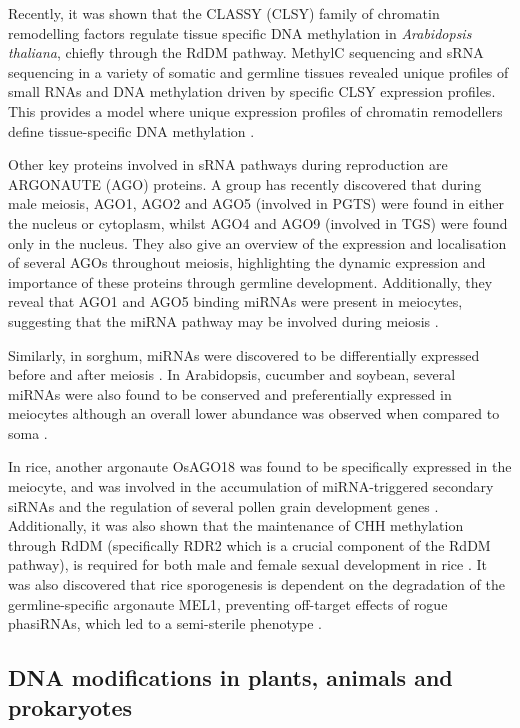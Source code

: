 Recently, it was shown that the CLASSY (CLSY) family of chromatin remodelling factors regulate tissue specific DNA methylation in \textit{Arabidopsis thaliana}, chiefly through the RdDM pathway. MethylC sequencing and sRNA sequencing in a variety of somatic and germline tissues revealed unique profiles of small RNAs and DNA methylation driven by specific CLSY expression profiles. This provides a model where unique expression profiles of chromatin remodellers define tissue-specific DNA methylation \citep{RN162}.  

Other key proteins involved in sRNA pathways during reproduction are ARGONAUTE (AGO) proteins. A group has recently discovered that during male meiosis, AGO1, AGO2 and AGO5 (involved in PGTS) were found in either the nucleus or cytoplasm, whilst AGO4 and AGO9 (involved in TGS) were found only in the nucleus. They also give an overview of the expression and localisation of several AGOs throughout meiosis, highlighting the dynamic expression and importance of these proteins through germline development. Additionally, they reveal that AGO1 and AGO5 binding miRNAs were present in meiocytes, suggesting that the miRNA pathway may be involved during meiosis \citep{RN149}.

Similarly, in sorghum, miRNAs were discovered to be differentially expressed before and after meiosis \citep{RN150}. In Arabidopsis, cucumber and soybean, several miRNAs were also found to be conserved and preferentially expressed in meiocytes although an overall lower abundance was observed when compared to soma \citep{RN151}.

In rice, another argonaute OsAGO18 was found to be specifically expressed in the meiocyte, and was involved in the accumulation of miRNA-triggered secondary siRNAs and the regulation of several pollen grain development genes \citep{RN153}. Additionally, it was also shown that the maintenance of CHH methylation through RdDM (specifically RDR2 which is a crucial component of the RdDM pathway), is required for both male and female sexual development in rice \citep{RN154}. It was also discovered that rice sporogenesis is dependent on the degradation of the germline-specific argonaute MEL1, preventing off-target effects of rogue phasiRNAs, which led to a semi-sterile phenotype \citep{RN155}.


\subsection{DNA modifications in plants, animals and prokaryotes}
